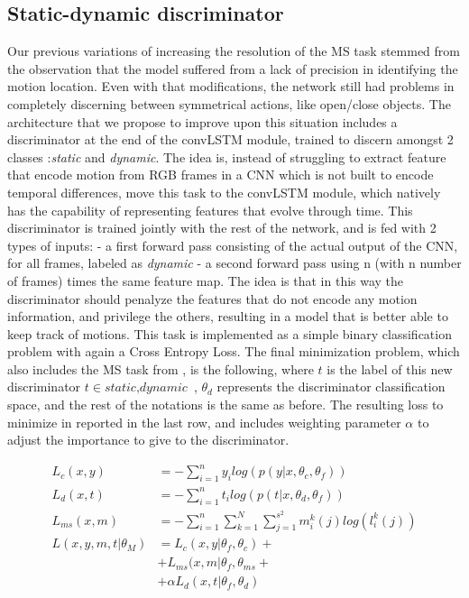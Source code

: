 \documentclass[10pt,twocolumn,hidelinks,letterpaper]{article}
\begin{document}
\subsection{Static-dynamic discriminator}

Our previous variations of increasing the resolution of the MS task stemmed from the observation that
the model suffered from a lack of precision in identifying the motion location. Even with that modifications, the network still had problems in completely discerning between symmetrical actions, like open/close objects. The architecture that we propose to improve upon this situation includes a discriminator at the end of the convLSTM module, trained to discern amongst 2 classes :\textit{static} and \textit{dynamic}. The idea is, instead of struggling to extract feature that encode motion from RGB frames
in a CNN which is not built to encode temporal differences, move this task to the convLSTM module,
which natively has the capability of representing features that evolve through time. This discriminator is trained jointly with the rest of the network, and is fed with 2 types of inputs:
- a first forward pass consisting of the actual output of the CNN, for all frames, labeled as \textit{dynamic}
- a second forward pass using n (with n number of frames) times the same feature map.
The idea is that in this way the discriminator should penalyze the features that do not encode
any motion information, and privilege the others, resulting in a model that is better able to
keep track of motions.
This task is implemented as a simple binary classification problem with again a Cross Entropy Loss.
The final minimization problem, which also includes the MS task from \cite{sparnet}, is the following,
where $t$ is the label of this new discriminator $t \in {\textit{static}, \textit{dynamic}}$ ,
$\theta_d$ represents the discriminator classification space, and the rest of the notations is the same as
before. The resulting loss to minimize in reported in the last row, and includes weighting parameter $\alpha$ to adjust the importance to give to the discriminator.

\begin{align*}
L_c(x,y) &= - \sum_{i=1}^{n} y_i log(p(y|x, \theta_c, \theta_f))\\
L_d(x,t) &= - \sum_{i=1}^{n} t_i log(p(t|x, \theta_d, \theta_f))\\
L_{ms}(x,m) &= - \sum_{i=1}^{n} \sum_{k=1}^{N} \sum_{j=1}^{s^2} m_i^k(j)log(l_i^k(j)) \\
L(x,y,m,t| \theta_M) &= L_c(x,y|\theta_f, \theta_c) + \\
&+ L_{ms}(x,m| \theta_f, \theta_{ms} + \\
&+ \alpha L_d(x,t| \theta_f, \theta_{d}  )
\end{align*}
\end{document}
